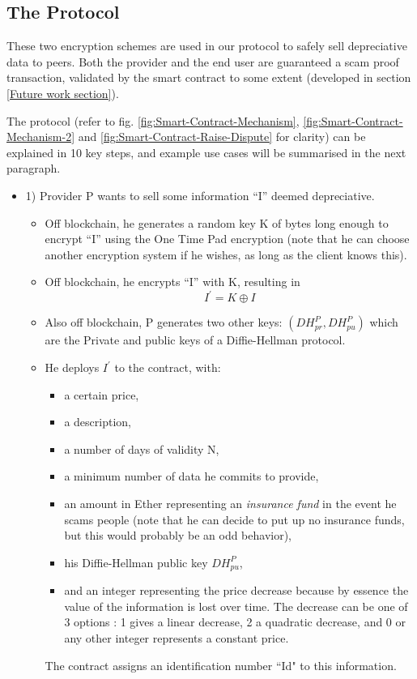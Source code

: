 \documentclass[conference]{IEEEtran}
\begin{document}
\subsection{The Protocol}


These two encryption schemes are used in our protocol to safely sell depreciative data to peers. Both the provider and the end user are guaranteed a scam proof transaction, validated by the smart contract to some extent (developed in section \ref{Future work section}).

The protocol (refer to fig. \ref{fig:Smart-Contract-Mechanism}, \ref{fig:Smart-Contract-Mechanism-2} and \ref{fig:Smart-Contract-Raise-Dispute} for clarity) can be explained in 10 key steps, and example use cases will be summarised in the next paragraph.
\begin{itemize}
    \item 1) Provider P wants to sell some information ``I'' deemed depreciative.
        \begin{itemize}
            \item Off blockchain, he generates a random key K of bytes long enough to encrypt ``I'' using the One Time Pad encryption (note that he can choose another encryption system if he wishes, as long as the client knows this).
            \item Off blockchain, he encrypts ``I'' with K, resulting in $$ I^{'} = K \oplus I $$
            \item Also off blockchain, P  generates two other keys: $(DH^{P}_{pr}, DH^{P}_{pu})$ which are the  Private and public keys of a Diffie-Hellman protocol.
            \item He deploys $I^{'}$ to the contract, with:
                \begin{itemize}
                    \item a certain price,
                    \item a description,
                    \item a number of days of validity N,
                    \item a minimum number of data he commits to provide,
                    \item  an amount in Ether representing an \textit{insurance fund} in the event he scams people (note that he can decide to put up no insurance funds, but this would probably be an odd behavior),
                    \item  his Diffie-Hellman public key $DH^{P}_{pu}$,
                    \item and an integer representing the price decrease because by essence the value of the information is lost over time. The decrease can be one of 3 options : 1 gives a linear decrease, 2 a quadratic decrease, and 0 or any other integer represents a constant price.
                \end{itemize}
            The contract assigns an identification number ``Id" to this information.


\end{itemize}
\end{itemize}
\end{document}

